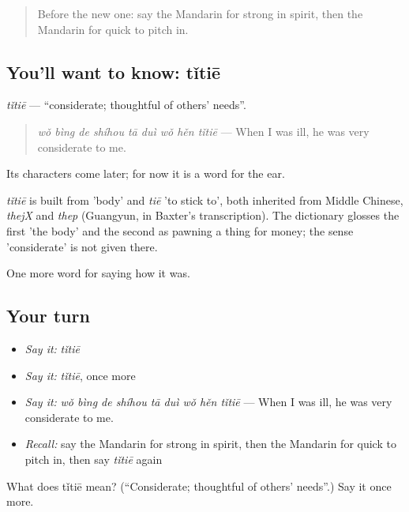 \label{lesson:ZH-C468-titie}



\begin{quote}
Before the new one: say the Mandarin for strong in spirit, then the Mandarin for quick to pitch in.
\end{quote}

\subsection*{You'll want to know: tǐtiē}
\emph{tǐtiē} — \textquotedblleft{}considerate; thoughtful of others' needs\textquotedblright{}.

\begin{quote}
\emph{wǒ bìng de shíhou tā duì wǒ hěn tǐtiē} — When I was ill, he was very considerate to me.
\end{quote}

Its characters come later; for now it is a word for the ear.

\begin{cousinweb}
\emph{tǐtiē} is built from  'body' and \emph{tiē} 'to stick to', both inherited from Middle Chinese, \emph{thejX} and \emph{thep} (Guangyun, in Baxter's transcription). The dictionary glosses the first 'the body' and the second as pawning a thing for money; the sense 'considerate' is not given there.
\end{cousinweb}

\begin{grammarlens}[title={What you've built}]
One more word for saying how it was.
\end{grammarlens}

\subsection*{Your turn}
\begin{itemize}
\raggedright
  \item \emph{Say it:} \emph{tǐtiē}
  \item \emph{Say it:} \emph{tǐtiē}, once more
  \item \emph{Say it:} \emph{wǒ bìng de shíhou tā duì wǒ hěn tǐtiē} — When I was ill, he was very considerate to me.
  \item \emph{Recall:} say the Mandarin for strong in spirit, then the Mandarin for quick to pitch in, then say \emph{tǐtiē} again
\end{itemize}

\begin{tcolorbox}[breakable,colback=teal!4,colframe=teal!35!black,title={Before you move on}]
What does tǐtiē mean? (\textquotedblleft{}Considerate; thoughtful of others' needs\textquotedblright{}.) Say it once more.
\end{tcolorbox}
